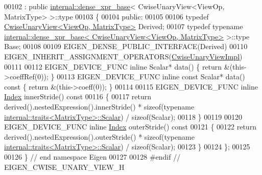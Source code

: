 \begin{DoxyCode}
00102   : \textcolor{keyword}{public} \hyperlink{struct_eigen_1_1internal_1_1dense__xpr__base}{internal::dense\_xpr\_base}< CwiseUnaryView<ViewOp, MatrixType> >::type
00103 \{
00104   \textcolor{keyword}{public}:
00105 
00106     \textcolor{keyword}{typedef} \hyperlink{group___core___module_class_eigen_1_1_cwise_unary_view}{CwiseUnaryView<ViewOp, MatrixType>} Derived;
00107     \textcolor{keyword}{typedef} \textcolor{keyword}{typename} 
      \hyperlink{struct_eigen_1_1internal_1_1dense__xpr__base}{internal::dense\_xpr\_base< CwiseUnaryView<ViewOp, MatrixType>}
       >::type Base;
00108 
00109     EIGEN\_DENSE\_PUBLIC\_INTERFACE(Derived)
00110     EIGEN\_INHERIT\_ASSIGNMENT\_OPERATORS(\hyperlink{class_eigen_1_1_cwise_unary_view_impl}{CwiseUnaryViewImpl})
00111     
00112     EIGEN\_DEVICE\_FUNC \textcolor{keyword}{inline} Scalar* data() \{ \textcolor{keywordflow}{return} &(this->coeffRef(0)); \}
00113     EIGEN\_DEVICE\_FUNC \textcolor{keyword}{inline} \textcolor{keyword}{const} Scalar* data()\textcolor{keyword}{ const }\{ \textcolor{keywordflow}{return} &(this->coeff(0)); \}
00114 
00115     EIGEN\_DEVICE\_FUNC \textcolor{keyword}{inline} \hyperlink{namespace_eigen_a62e77e0933482dafde8fe197d9a2cfde}{Index} innerStride()\textcolor{keyword}{ const}
00116 \textcolor{keyword}{    }\{
00117       \textcolor{keywordflow}{return} derived().nestedExpression().innerStride() * \textcolor{keyword}{sizeof}(\textcolor{keyword}{typename} 
      \hyperlink{struct_eigen_1_1internal_1_1traits}{internal::traits<MatrixType>::Scalar}) / \textcolor{keyword}{sizeof}(Scalar);
00118     \}
00119 
00120     EIGEN\_DEVICE\_FUNC \textcolor{keyword}{inline} \hyperlink{namespace_eigen_a62e77e0933482dafde8fe197d9a2cfde}{Index} outerStride()\textcolor{keyword}{ const}
00121 \textcolor{keyword}{    }\{
00122       \textcolor{keywordflow}{return} derived().nestedExpression().outerStride() * \textcolor{keyword}{sizeof}(\textcolor{keyword}{typename} 
      \hyperlink{struct_eigen_1_1internal_1_1traits}{internal::traits<MatrixType>::Scalar}) / \textcolor{keyword}{sizeof}(Scalar);
00123     \}
00124 \};
00125 
00126 \} \textcolor{comment}{// end namespace Eigen}
00127 
00128 \textcolor{preprocessor}{#endif // EIGEN\_CWISE\_UNARY\_VIEW\_H}
\end{DoxyCode}
